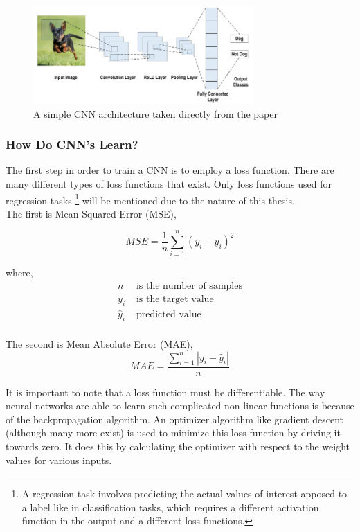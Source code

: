 \begin{figure}
	\includegraphics[width=0.75\textwidth]{../Figures/classical_cnn.png}
	\centering
	\caption[CNN]{A simple CNN architecture taken directly from the  paper \cite{alzubaidi2021review}} 
	\label{simple_cnn}
\end{figure}

\subsubsection*{How Do CNN's Learn?}
The first step in order to train a CNN is to employ a loss function. There are many different types of loss functions that exist. Only loss functions used for regression tasks \footnote{A regression task involves predicting the actual values of interest apposed to a label like in classification tasks, which requires a different activation function in the output and a different loss functions.} will be mentioned due to the nature of this thesis. \\

The first is Mean Squared Error (MSE),

\begin{equation}
	\label{eq:2.2}
	MSE = \frac{1}{n}\sum_{i=1}^{n}\left(y_{i} - \hat{y}_{i}\right)^{2}
\end{equation}

where,
\begin{align*}
	n &  \text{ is the number of samples} \\
	y_{i} &  \text{ is the target value }\\
	\hat{y}_{i} &  \text{ predicted value} \\
\end{align*}

The second is Mean Absolute Error (MAE),
\begin{equation}
	\label{eq:2.3}
	MAE = \frac{\sum_{i=1}^{n}\left|y_{i} - \hat{y}_{i}\right|}{n}
\end{equation}

It is important to note that a loss function must be differentiable. The way neural networks are able to learn such complicated non-linear functions is because of the backpropagation algorithm. An optimizer algorithm like gradient descent (although many more exist) is used to minimize this loss function by driving it towards zero. It does this by calculating the optimizer with respect to the weight values for various inputs.

